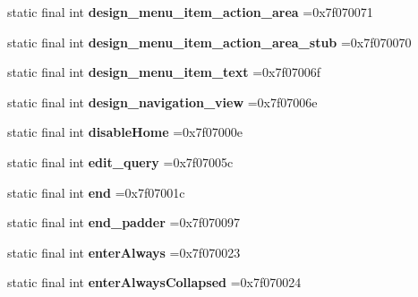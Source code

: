 \begin{DoxyCompactItemize}
static final int {\bfseries design\+\_\+menu\+\_\+item\+\_\+action\+\_\+area} =0x7f070071
\item 
\mbox{\label{classproject4_1_1xaria_1_1R_1_1id_a81bf6a6d9944974c90b4c3859a454658}} 
static final int {\bfseries design\+\_\+menu\+\_\+item\+\_\+action\+\_\+area\+\_\+stub} =0x7f070070
\item 
\mbox{\label{classproject4_1_1xaria_1_1R_1_1id_ab2672ed1fd3df84d8117ac06a960a0b9}} 
static final int {\bfseries design\+\_\+menu\+\_\+item\+\_\+text} =0x7f07006f
\item 
\mbox{\label{classproject4_1_1xaria_1_1R_1_1id_a4ab8efc9922059d3d4935f7bfdff9e3a}} 
static final int {\bfseries design\+\_\+navigation\+\_\+view} =0x7f07006e
\item 
\mbox{\label{classproject4_1_1xaria_1_1R_1_1id_a6eda5cc24aa1ac0cfad795c66186eabd}} 
static final int {\bfseries disable\+Home} =0x7f07000e
\item 
\mbox{\label{classproject4_1_1xaria_1_1R_1_1id_a0d1fa87d4ea0084d7d9944b6891acb58}} 
static final int {\bfseries edit\+\_\+query} =0x7f07005c
\item 
\mbox{\label{classproject4_1_1xaria_1_1R_1_1id_aafc81f2fb68c1603e28c85d32bd4c7bb}} 
static final int {\bfseries end} =0x7f07001c
\item 
\mbox{\label{classproject4_1_1xaria_1_1R_1_1id_a891f8d7f5e60b938918d7d4169e34d7f}} 
static final int {\bfseries end\+\_\+padder} =0x7f070097
\item 
\mbox{\label{classproject4_1_1xaria_1_1R_1_1id_a1b4123ec77592a9edf088509711ef63b}} 
static final int {\bfseries enter\+Always} =0x7f070023
\item 
\mbox{\label{classproject4_1_1xaria_1_1R_1_1id_a70d77789c3b5d774eac33fb7739bc336}} 
static final int {\bfseries enter\+Always\+Collapsed} =0x7f070024
\item 

\end{DoxyCompactItemize}
